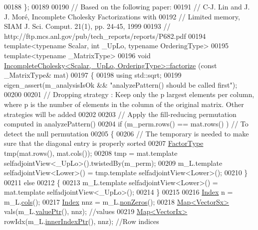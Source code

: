 \begin{DoxyCode}
00188 \}; 
00189 
00190 \textcolor{comment}{// Based on the following paper:}
00191 \textcolor{comment}{//   C-J. Lin and J. J. Moré, Incomplete Cholesky Factorizations with}
00192 \textcolor{comment}{//   Limited memory, SIAM J. Sci. Comput.  21(1), pp. 24-45, 1999}
00193 \textcolor{comment}{//   http://ftp.mcs.anl.gov/pub/tech\_reports/reports/P682.pdf}
00194 \textcolor{keyword}{template}<\textcolor{keyword}{typename} Scalar, \textcolor{keywordtype}{int} \_UpLo, \textcolor{keyword}{typename} OrderingType>
00195 \textcolor{keyword}{template}<\textcolor{keyword}{typename} \_MatrixType>
00196 \textcolor{keywordtype}{void} \hyperlink{class_eigen_1_1_incomplete_cholesky_ac39c75ff7ca5d2db9a9f03b937e12601}{IncompleteCholesky<Scalar,\_UpLo, OrderingType>::factorize}
      (\textcolor{keyword}{const} \_MatrixType& mat)
00197 \{
00198   \textcolor{keyword}{using} std::sqrt;
00199   eigen\_assert(m\_analysisIsOk && \textcolor{stringliteral}{"analyzePattern() should be called first"}); 
00200     
00201   \textcolor{comment}{// Dropping strategy : Keep only the p largest elements per column, where p is the number of elements in
       the column of the original matrix. Other strategies will be added}
00202   
00203   \textcolor{comment}{// Apply the fill-reducing permutation computed in analyzePattern()}
00204   \textcolor{keywordflow}{if} (m\_perm.rows() == mat.rows() ) \textcolor{comment}{// To detect the null permutation}
00205   \{
00206     \textcolor{comment}{// The temporary is needed to make sure that the diagonal entry is properly sorted}
00207     \hyperlink{group___sparse_core___module}{FactorType} tmp(mat.rows(), mat.cols());
00208     tmp = mat.template selfadjointView<\_UpLo>().twistedBy(m\_perm);
00209     m\_L.template selfadjointView<Lower>() = tmp.template selfadjointView<Lower>();
00210   \}
00211   \textcolor{keywordflow}{else}
00212   \{
00213     m\_L.template selfadjointView<Lower>() = mat.template selfadjointView<\_UpLo>();
00214   \}
00215   
00216   \hyperlink{namespace_eigen_a62e77e0933482dafde8fe197d9a2cfde}{Index} n = m\_L.\hyperlink{group___sparse_core___module_aa391750e3c530227e4a5c3c52e959975}{cols}(); 
00217   \hyperlink{namespace_eigen_a62e77e0933482dafde8fe197d9a2cfde}{Index} nnz = m\_L.\hyperlink{group___sparse_core___module_a03de8b3da2c142ce8698a76123b3e7d3}{nonZeros}();
00218   \hyperlink{group___core___module_class_eigen_1_1_map}{Map<VectorSx>} vals(m\_L.\hyperlink{group___sparse_core___module_a9d4354d3f4d121d764bbed33cac05329}{valuePtr}(), nnz);         \textcolor{comment}{//values}
00219   \hyperlink{group___core___module_class_eigen_1_1_map}{Map<VectorIx>} rowIdx(m\_L.\hyperlink{group___sparse_core___module_ae7b804bd39745156d20ca1611a296b67}{innerIndexPtr}(), nnz);  \textcolor{comment}{//Row indices}

\end{DoxyCode}
